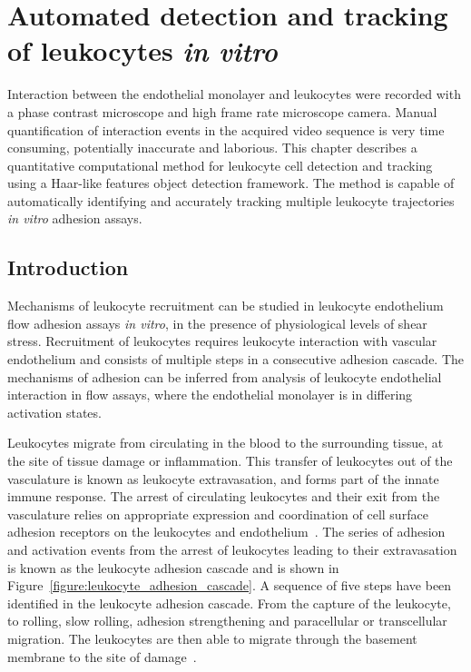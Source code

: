 \chapter{Automated detection and tracking of leukocytes \emph{in vitro}}
\label{leukocytes}
\ifpdf
    \graphicspath{{chapter_4/figs/}}
\fi

\nomenclature[g-pi]{$\pi$}{ $\simeq 3.14\ldots$}

Interaction between the endothelial monolayer and leukocytes were recorded with a phase contrast microscope and high frame rate microscope camera. Manual quantification of interaction events in the acquired video sequence is very time consuming, potentially inaccurate and laborious. This chapter describes a quantitative computational method for leukocyte cell detection and tracking using a Haar-like features object detection framework. The method is capable of automatically identifying and accurately tracking multiple leukocyte trajectories \emph{in vitro} adhesion assays.

\section{Introduction}
\label{leukocytes:introduction}
Mechanisms of leukocyte recruitment can be studied in leukocyte endothelium flow adhesion assays \emph{in vitro}, in the presence of physiological levels of shear stress. Recruitment of leukocytes requires leukocyte interaction with vascular endothelium and consists of multiple steps in a consecutive adhesion cascade. The mechanisms of adhesion can be inferred from analysis of leukocyte endothelial interaction in flow assays, where the endothelial monolayer is in differing activation states.

Leukocytes migrate from circulating in the blood to the surrounding tissue, at the site of tissue damage or inflammation. This transfer of leukocytes out of the vasculature is known as leukocyte extravasation, and forms part of the innate immune response. The arrest of circulating leukocytes and their exit from the vasculature relies on appropriate expression and coordination of cell surface adhesion receptors on the leukocytes and endothelium~\cite{Mayadas1993}. The series of adhesion and activation events from the arrest of leukocytes leading to their extravasation is known as the leukocyte adhesion cascade and is shown in Figure~\ref{figure:leukocyte_adhesion_cascade}. A sequence of five steps have been identified in the leukocyte adhesion cascade. From the capture of the leukocyte, to rolling, slow rolling, adhesion strengthening and paracellular or transcellular migration. The leukocytes are then able to migrate through the basement membrane to the site of damage~\cite{Ley2007}.

